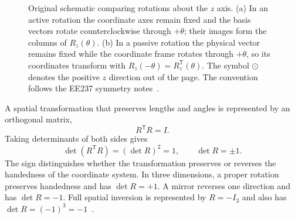 \begin{figure}[htbp]
    \caption{Original schematic comparing rotations about the $z$ axis.
        (a) In an active rotation the coordinate axes remain fixed and the basis
        vectors rotate counterclockwise through $+\theta$; their images form the
        columns of $R_z(\theta)$.  (b) In a passive rotation the physical vector
        remains fixed while the coordinate frame rotates through $+\theta$, so its
        coordinates transform with $R_z(-\theta)=R_z^{\mathsf T}(\theta)$.  The
        symbol $\odot$ denotes the positive $z$ direction out of the page.  The
        convention follows the EE237 symmetry notes~\cite{ee237-week11}.}
    \label{fig:active-passive-z-rotation}
\end{figure}

A spatial transformation that preserves lengths and angles is represented by
an orthogonal matrix,
\begin{equation}
    R^{\mathsf T}R=I.
    \label{eq:orthogonal-spatial-transformation}
\end{equation}
Taking determinants of both sides gives
\begin{equation}
    \det(R^{\mathsf T}R)=(\det R)^2=1,
    \qquad \det R=\pm 1.
    \label{eq:orthogonal-determinant}
\end{equation}
The sign distinguishes whether the transformation preserves or reverses the
handedness of the coordinate system.  In three dimensions, a proper rotation
preserves handedness and has $\det R=+1$.  A mirror reverses one direction and
has $\det R=-1$.  Full spatial inversion is represented by $R=-I_3$ and also
has $\det R=(-1)^3=-1$~\cite{ee237-week11}.

